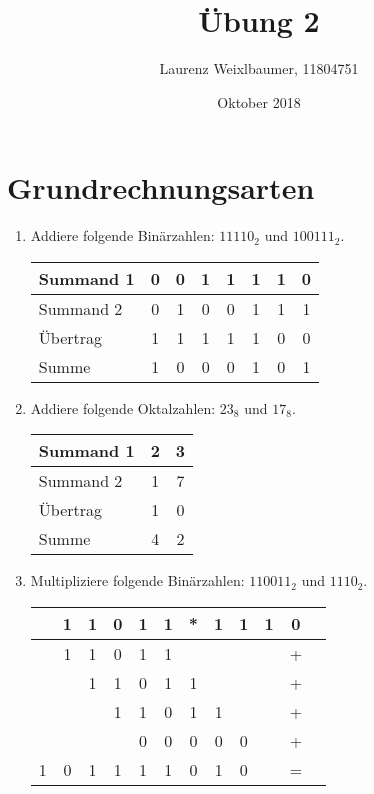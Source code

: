 \documentclass{article}
\title{Übung 2}
\author{Laurenz Weixlbaumer, 11804751}
\date{Oktober 2018}
\begin{document}
\maketitle

\section{Grundrechnungsarten}

\begin{enumerate}
\item Addiere folgende Binärzahlen: $11110_2$ und $100111_2$.

\begin{center}
\begin{tabular}{l | c | c | c | c | c | c | c }
     Summand 1 & 0 & 0 & 1 & 1 & 1 & 1 & 0 \\
     \hline
     Summand 2 & 0 & 1 & 0 & 0 & 1 & 1 & 1 \\
     \hline
     Übertrag  & 1 & 1 & 1 & 1 & 1 & 0 & 0 \\
     \hline
     \hline
     Summe     & 1 & 0 & 0 & 0 & 1 & 0 & 1
\end{tabular}
\end{center}

\item Addiere folgende Oktalzahlen: $23_8$ und $17_8$.

\begin{center}
\begin{tabular}{l | c | c }
     Summand 1 & 2 & 3 \\
     \hline
     Summand 2 & 1 & 7 \\
     \hline
     Übertrag  & 1 & 0 \\
     \hline\hline
     Summe     & 4 & 2
\end{tabular}
\end{center}

\item Multipliziere folgende Binärzahlen: $110011_2$ und $1110_2$.

\begin{center}
\begin{tabular}{ c c c c c c c c c c c c }
      & 1 & 1 & 0 & 1 & 1 & * & 1 & 1 & 1 & 0 \\
    \hline
      & 1 & 1 & 0 & 1 & 1 &   &   &   &   & + \\
      &   & 1 & 1 & 0 & 1 & 1 &   &   &   & + \\
      &   &   & 1 & 1 & 0 & 1 & 1 &   &   & + \\
      &   &   &   & 0 & 0 & 0 & 0 & 0 &   & + \\
    \hline\hline
    1 & 0 & 1 & 1 & 1 & 1 & 0 & 1 & 0 &   & = \\
\end{tabular}
\end{center}


\end{enumerate}
\end{document}
